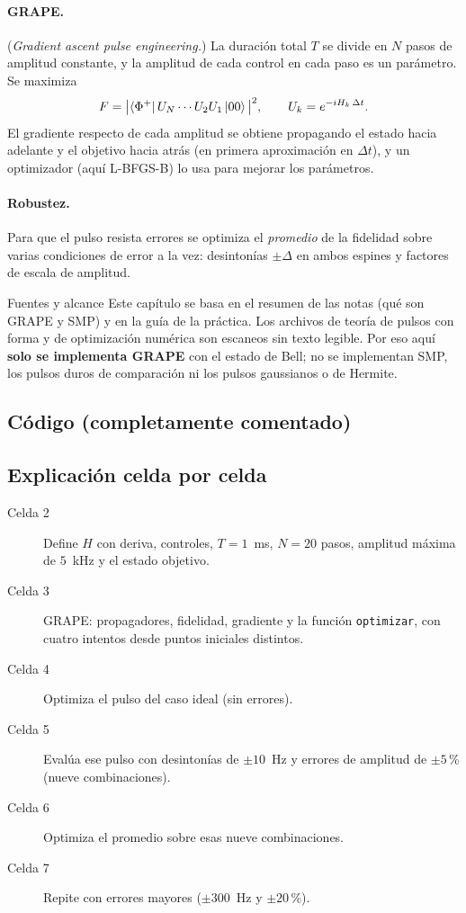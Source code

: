\paragraph{GRAPE.} (\emph{Gradient ascent pulse engineering.}) La duración total
$T$ se divide en $N$ pasos de amplitud constante, y la amplitud de cada control
en cada paso es un parámetro. Se maximiza
\begin{equation}
  F=\big|\langle\Phi^+|\,U_N\cdots U_2U_1\left|00\right\rangle\big|^2,\qquad
  U_k=e^{-iH_k\,\Delta t}.
\end{equation}
El gradiente respecto de cada amplitud se obtiene propagando el estado hacia
adelante y el objetivo hacia atrás (en primera aproximación en $\Delta t$), y un
optimizador (aquí L-BFGS-B) lo usa para mejorar los parámetros.

\paragraph{Robustez.} Para que el pulso resista errores se optimiza el
\emph{promedio} de la fidelidad sobre varias condiciones de error a la vez:
desintonías $\pm\Delta$ en ambos espines y factores de escala de amplitud.

\begin{nota}{Fuentes y alcance}
Este capítulo se basa en el resumen de las notas (qué son GRAPE y SMP) y en la
guía de la práctica. Los archivos de teoría de pulsos con forma y de
optimización numérica son escaneos sin texto legible. Por eso aquí \textbf{solo se
implementa GRAPE} con el estado de Bell; no se implementan SMP, los pulsos duros
de comparación ni los pulsos gaussianos o de Hermite.
\end{nota}

\subsection{Código (completamente comentado)}


\subsection{Explicación celda por celda}
\begin{description}
  \item[Celda 2] Define $H$ con deriva, controles, $T=1$~ms, $N=20$ pasos,
    amplitud máxima de $5$~kHz y el estado objetivo.
  \item[Celda 3] GRAPE: propagadores, fidelidad, gradiente y la función
    \texttt{optimizar}, con cuatro intentos desde puntos iniciales distintos.
  \item[Celda 4] Optimiza el pulso del caso ideal (sin errores).
  \item[Celda 5] Evalúa ese pulso con desintonías de $\pm10$~Hz y errores de
    amplitud de $\pm5$\,\% (nueve combinaciones).
  \item[Celda 6] Optimiza el promedio sobre esas nueve combinaciones.
  \item[Celda 7] Repite con errores mayores ($\pm300$~Hz y $\pm20$\,\%).
\end{description}

